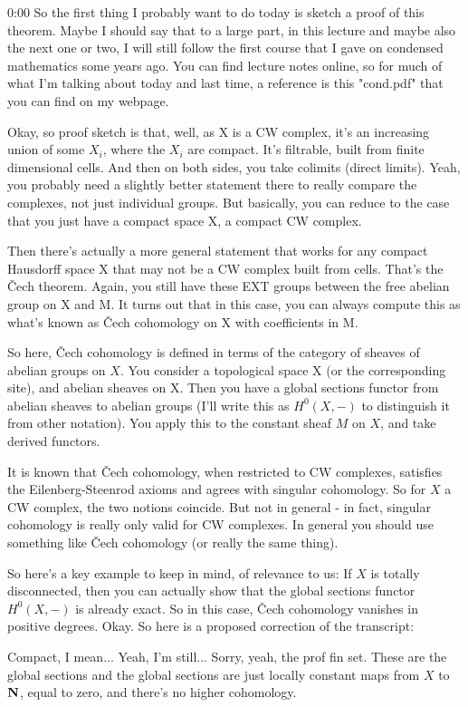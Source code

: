 \begin{unfinished}{0:00}
So the first thing I probably want to do today is sketch a proof of this theorem. Maybe I should say that to a large part, in this lecture and maybe also the next one or two, I will still follow the first course that I gave on condensed mathematics some years ago. You can find lecture notes online, so for much of what I'm talking about today and last time, a reference is this "cond.pdf" that you can find on my webpage.

Okay, so proof sketch is that, well, as X is a CW complex, it's an increasing union of some $X_i$, where the $X_i$ are compact. It's filtrable, built from finite dimensional cells. And then on both sides, you take colimits (direct limits). Yeah, you probably need a slightly better statement there to really compare the complexes, not just individual groups. But basically, you can reduce to the case that you just have a compact space X, a compact CW complex.

Then there's actually a more general statement that works for any compact Hausdorff space X that may not be a CW complex built from cells. That's the Čech theorem. Again, you still have these EXT groups between the free abelian group on X and M. It turns out that in this case, you can always compute this as what's known as Čech cohomology on X with coefficients in M.

So here, \v Cech cohomology is defined in terms of the category of sheaves of abelian groups on $X$. You consider a topological space X (or the corresponding site), and abelian sheaves on X. Then you have a global sections functor from abelian sheaves to abelian groups (I'll write this as $H^0(X, -)$ to distinguish it from other notation). You apply this to the constant sheaf $M$ on $X$, and take derived functors.


It is known that Čech cohomology, when restricted to CW complexes, satisfies the Eilenberg-Steenrod axioms and agrees with singular cohomology. So for $X$ a CW complex, the two notions coincide. But not in general - in fact, singular cohomology is really only valid for CW complexes. In general you should use something like Čech cohomology (or really the same thing).

So here's a key example to keep in mind, of relevance to us: If $X$ is totally disconnected, then you can actually show that the global sections functor $H^0(X, -)$ is already exact. So in this case, Čech cohomology vanishes in positive degrees. Okay.
So here is a proposed correction of the transcript:

Compact, I mean... Yeah, I'm still... Sorry, yeah, the prof fin set. These are the global sections and the global sections are just locally constant maps from $X$ to $\mathbf N$, equal to zero, and there's no higher cohomology.


\end{unfinished}
